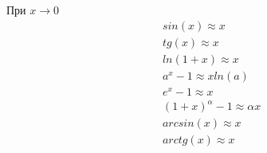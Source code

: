 \vspace{2ex}
При $x \to 0$
\begin{equation}
    \begin{aligned}
        &sin(x) \approx x \\
        &tg(x) \approx x \\
        &ln(1+x) \approx x \\
        &a^x - 1 \approx xln(a) \\
        &e^x - 1 \approx x \\
        &(1 + x)^\alpha - 1 \approx \alpha x \\
        &arcsin(x) \approx x \\
        &arctg(x) \approx x \\
    \end{aligned}
\end{equation}